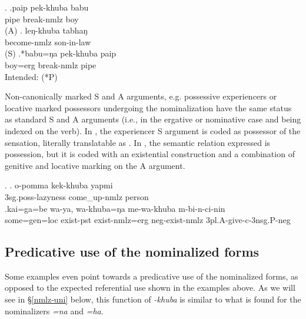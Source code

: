 \ex. \ag.paip pek-khuba babu\\
	pipe break-{\sc nmlz} boy\\
	 (A)
	\bg. leŋ-khuba tabhaŋ\\
	become{\sc -nmlz} son-in-law\\
	 (S)
	 \bg.*babu=ŋa pek-khuba paip\\ 
	boy{\sc =erg} break-{\sc nmlz} pipe		\\ 
	Intended:  (*P)
	
 
Non-canonically marked S and A arguments, e.g. possessive experiencers or locative marked possessors undergoing the nominalization have the same status as standard S and A arguments (i.e., in the ergative or nominative case and being indexed on the verb). In  \Next[a], the experiencer S argument is coded as possessor of the sensation, literally translatable as . In \Next[b], the semantic relation expressed is possession, but it is coded with an existential construction and a combination of genitive and locative marking on the A argument.


\ex. \ag. o-pomma kek-khuba yapmi\\
	{\sc 3sg.poss}-lazyness come\_up-{\sc nmlz} person	\\
\bg.kai=ga=be  wa-ya, wa-khuba=ŋa   me-wa-khuba    m-bi-n-ci-nin\\
		some{\sc =gen=loc} exist{\sc [3sg]-pst}  exist-{\sc nmlz=erg} {\sc neg}-exist-{\sc nmlz} {\sc 3pl.A}-give{\sc [pst]-c-3nsg.P-neg}	\\
	 

	
\subsection{Predicative use of the nominalized forms}
	
Some examples even point towards a predicative use of the nominalized forms, as opposed to the expected referential use shown in the examples above. As we will see in §\ref{nmlz-uni} below, this function of \emph{-khuba} is similar to what is found for the nominalizers \emph{=na} and \emph{=ha}.

